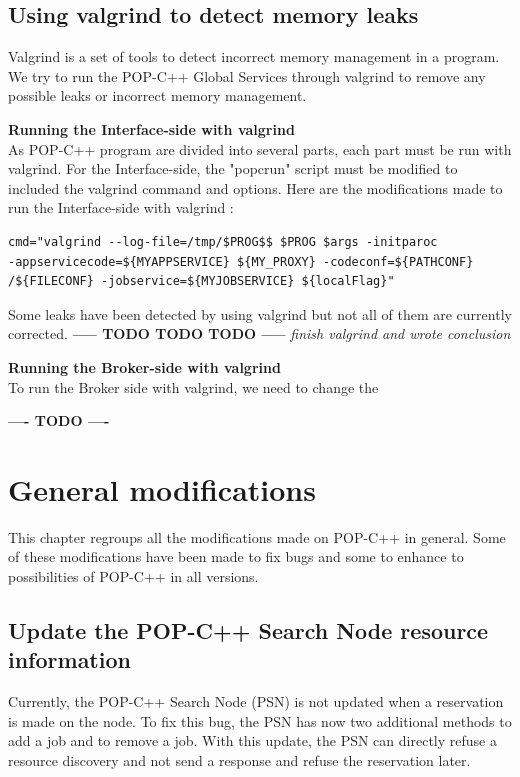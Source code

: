 \subsection{Using valgrind to detect memory leaks}
Valgrind is a set of tools to detect incorrect memory management in a program. We try to run the POP-C++ Global Services through valgrind to remove any possible leaks or incorrect memory management. \s

\textbf{Running the Interface-side with valgrind}\\
As POP-C++ program are divided into several parts, each part must be run with valgrind. For the Interface-side, the "popcrun" script must be modified to included the valgrind command and options. Here are the modifications made to run the Interface-side with valgrind : \s

\begin{lstlisting}
cmd="valgrind --log-file=/tmp/$PROG$$ $PROG $args -initparoc 
-appservicecode=${MYAPPSERVICE} ${MY_PROXY} -codeconf=${PATHCONF}
/${FILECONF} -jobservice=${MYJOBSERVICE} ${localFlag}"
\end{lstlisting}\s

Some leaks have been detected by using valgrind but not all of them are currently corrected. 
\textbf{----- TODO TODO TODO -----} \textit{finish valgrind and wrote conclusion}

\textbf{Running the Broker-side with valgrind}\\
To run the Broker side with valgrind, we need to change the 

\textbf{---- TODO ----}
\s

%
%
\pagebreak
\section{General modifications}
\label{sec:gen_mod}
This chapter regroups all the modifications made on POP-C++ in general. Some of these modifications have been made to fix bugs and some to enhance to possibilities of POP-C++ in all versions. 

\subsection{Update the POP-C++ Search Node resource information}
Currently, the POP-C++ Search Node (PSN) is not updated when a reservation is made on the node. To fix this bug, the PSN has now two additional methods to add a job and to remove a job. With this update, the PSN can directly refuse a resource discovery and not send a response and refuse the reservation later.\s

